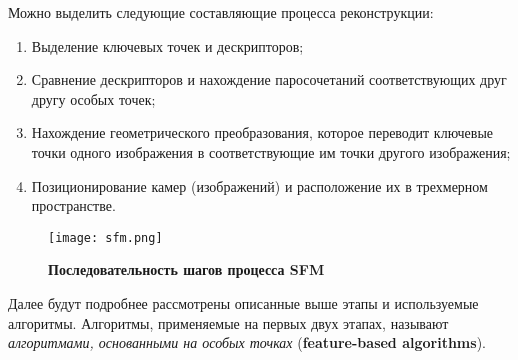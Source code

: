 Можно выделить следующие составляющие процесса реконструкции: 
\begin{enumerate}
    \item Выделение ключевых точек и дескрипторов;
    \item Сравнение дескрипторов и нахождение паросочетаний соответствующих друг другу особых точек;
    \item Нахождение геометрического преобразования, которое переводит ключевые точки одного изображения в соответствующие им точки другого изображения;
    \item Позиционирование камер (изображений) и расположение их в трехмерном пространстве.
\end{enumerate}

\begin{figure}[h]
    \centering
    \texttt{[image: sfm.png]}
    \caption{\textbf{Последовательность шагов процесса SFM}}
    \label{fig:sfm}
\end{figure}

Далее будут подробнее рассмотрены описанные выше этапы и используемые алгоритмы. Алгоритмы, применяемые на первых двух этапах, называют \textit{алгоритмами, основанными на особых точках} (\textbf{feature-based algorithms}).

